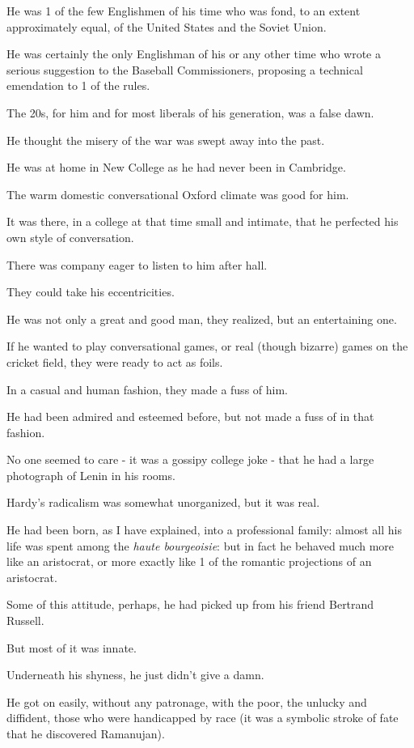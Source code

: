 \documentclass{article}
\numberwithin{equation}{section}
\begin{document}
He was 1 of the few Englishmen of his time who was fond, to an extent approximately equal, of the United States and the Soviet Union.

He was certainly the only Englishman of his or any other time who wrote a serious suggestion to the Baseball Commissioners, proposing a technical emendation to 1 of the rules.

The 20s, for him and for most liberals of his generation, was a false dawn.

He thought the misery of the war was swept away into the past.

%
He was at home in New College as he had never been in Cambridge.

The warm domestic conversational Oxford climate was good for him.

It was there, in a college at that time small and intimate, that he perfected his own style of conversation.

There was company eager to listen to him after hall.

They could take his eccentricities.

He was not only a great and good man, they realized, but an entertaining one.

If he wanted to play conversational games, or real (though bizarre) games on the cricket field, they were ready to act as foils.

In a casual and human fashion, they made a fuss of him.

He had been admired and esteemed before, but not made a fuss of in that fashion.

%
No one seemed to care - it was a gossipy college joke - that he had a large photograph of Lenin in his rooms.

Hardy's radicalism was somewhat unorganized, but it was real.

He had been born, as I have explained, into a professional family: almost all his life was spent among the \textit{haute bourgeoisie}: but in fact he behaved much more like an aristocrat, or more exactly like 1 of the romantic projections of an aristocrat.

Some of this attitude, perhaps, he had picked up from his friend Bertrand Russell.

But most of it was innate.

Underneath his shyness, he just didn't give a damn.

%
He got on easily, without any patronage, with the poor, the unlucky and diffident, those who were handicapped by race (it was a symbolic stroke of fate that he discovered Ramanujan).
\end{document}
